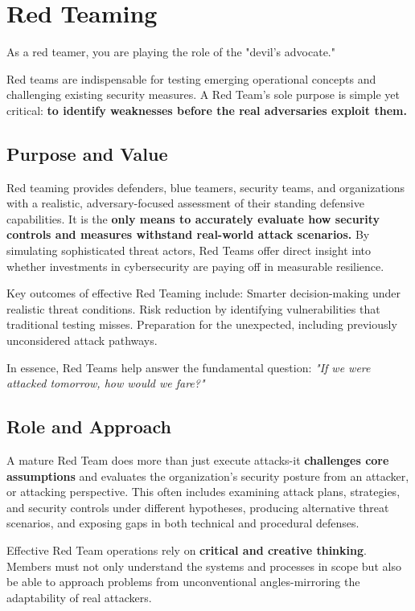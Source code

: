 \section{Red Teaming}
As a red teamer, you are playing the role of the "devil's advocate."

Red teams are indispensable for testing emerging operational concepts and challenging existing security measures. A Red Team's sole purpose is simple yet critical: \textbf{to identify weaknesses before the real adversaries exploit them.}

\subsection{Purpose and Value}
Red teaming provides defenders, blue teamers, security teams, and organizations with a realistic, adversary-focused assessment of their standing defensive capabilities. It is the \textbf{only means to accurately evaluate how security controls and measures withstand real-world attack scenarios.} By simulating sophisticated threat actors, Red Teams offer direct insight into whether investments in cybersecurity are paying off in measurable resilience.

Key outcomes of effective Red Teaming include:
Smarter decision-making under realistic threat conditions.
Risk reduction by identifying vulnerabilities that traditional testing misses.
Preparation for the unexpected, including previously unconsidered attack pathways.

In essence, Red Teams help answer the fundamental question:
\textit{"If we were attacked tomorrow, how would we fare?"}

\subsection{Role and Approach}
A mature Red Team does more than just execute attacks-it \textbf{challenges core assumptions} and evaluates the organization's security posture from an attacker, or attacking perspective. This often includes examining attack plans, strategies, and security controls under different hypotheses, producing alternative threat scenarios, and exposing gaps in both technical and procedural defenses.

Effective Red Team operations rely on \textbf{critical and creative thinking}. Members must not only understand the systems and processes in scope but also be able to approach problems from unconventional angles-mirroring the adaptability of real attackers.

